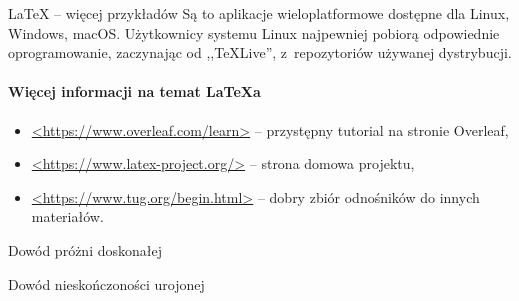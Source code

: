 \begin{easyappendix}{\LaTeX{} -- więcej przykładów}
Są to aplikacje wieloplatformowe dostępne dla Linux, Windows, macOS. Użytkownicy systemu Linux najpewniej pobiorą odpowiednie oprogramowanie, zaczynając od ,,\TeX Live'', z~repozytoriów używanej dystrybucji.

\paragraph{Więcej informacji na temat \LaTeX{a}}
\begin{itemize}
	\item \href{https://www.overleaf.com/learn}{<https://www.overleaf.com/learn>} -- przystępny tutorial na stronie Overleaf,
	\item \href{https://www.latex-project.org/}{<https://www.latex-project.org/>} -- strona domowa projektu,
	\item \href{https://www.tug.org/begin.html}{<https://www.tug.org/begin.html>} -- dobry zbiór odnośników do innych materiałów.
\end{itemize}


\end{easyappendix}

\begin{easyappendix}{Dowód próżni doskonałej}
\end{easyappendix}

\begin{easyappendix}{Dowód nieskończoności urojonej}
\end{easyappendix}
